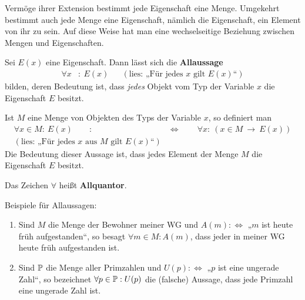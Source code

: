 \begin{bem} \label{mengenvseig}
Vermöge ihrer Extension bestimmt jede Eigenschaft eine Menge. Umgekehrt bestimmt auch jede Menge eine Eigenschaft, nämlich die Eigenschaft, ein Element von ihr zu sein. Auf diese Weise hat man eine wechselseitige Beziehung zwischen Mengen und Eigenschaften.
\end{bem}


\begin{de}[Allaussage] \label{def:allquant}
    Sei $E(x)$ eine Eigenschaft. Dann lässt sich die \textbf{Allaussage}
    \begin{align*}
        \forall x &:\  E(x) && (\text{lies: „Für jedes $x$ gilt $E(x)$“})
    \end{align*}
    bilden, deren Bedeutung ist, dass \emph{jedes} Objekt vom Typ der Variable $x$ die Eigenschaft $E$ besitzt.
    
    Ist $M$ eine Menge von Objekten des Typs der Variable $x$, so definiert man
    \begin{align*}
        \forall x\in M:\ E(x) \qquad :& \Leftrightarrow\qquad \forall x:\ (x\in M\ \to\ E(x))  \\
        (\text{lies: „Für jedes $x$ aus $M$ gilt $E(x)$“}) &
    \end{align*}
    Die Bedeutung dieser Aussage ist, dass jedes Element der Menge $M$ die Eigenschaft $E$ besitzt.
    
    Das Zeichen $\forall$ heißt \textbf{Allquantor}.
\end{de}


\begin{bsp}
    Beispiele für Allaussagen:
    \begin{enumerate}
        \item Sind $M$ die Menge der Bewohner meiner WG und $A(m):\Leftrightarrow$ „$m$ ist heute früh aufgestanden“, so besagt $\forall m\in M: A(m)$, dass jeder in meiner WG heute früh aufgestanden ist.
        \item Sind $\mathbb P$ die Menge aller Primzahlen und $U(p):\Leftrightarrow$ „$p$ ist eine ungerade Zahl“, so bezeichnet $\forall p\in\mathbb P : U(p)$ die (falsche) Aussage, dass jede Primzahl eine ungerade Zahl ist.
    \end{enumerate}
\end{bsp}


